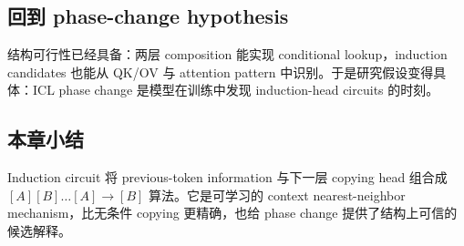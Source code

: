 \subsection{回到 phase-change hypothesis}

结构可行性已经具备：两层 composition 能实现 conditional lookup，induction candidates 也能从 QK/OV 与 attention pattern 中识别。于是研究假设变得具体：ICL phase change 是模型在训练中发现 induction-head circuits 的时刻。



\subsection{本章小结}

Induction circuit 将 previous-token information 与下一层 copying head 组合成 $[A][B]\ldots[A]\to[B]$ 算法。它是可学习的 context nearest-neighbor mechanism，比无条件 copying 更精确，也给 phase change 提供了结构上可信的候选解释。

